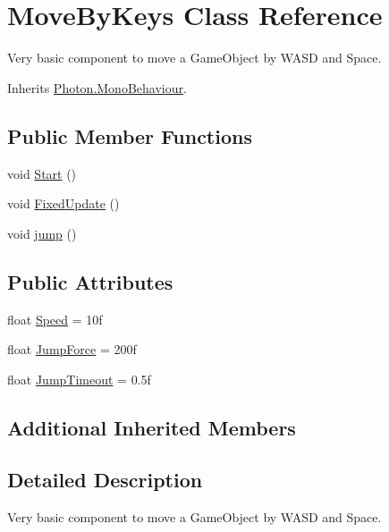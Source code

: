 \hypertarget{class_move_by_keys}{}\section{Move\+By\+Keys Class Reference}
\label{class_move_by_keys}


Very basic component to move a Game\+Object by W\+A\+SD and Space.  




Inherits \hyperlink{class_photon_1_1_mono_behaviour}{Photon.\+Mono\+Behaviour}.

\subsection*{Public Member Functions}
\begin{DoxyCompactItemize}
\item 
void \hyperlink{class_move_by_keys_a12c386cc63b886a811e2801c6631f7c6}{Start} ()
\item 
void \hyperlink{class_move_by_keys_aeeea5b489d6daab0aa8e9fc1672f5310}{Fixed\+Update} ()
\item 
void \hyperlink{class_move_by_keys_ac525502eb52c76a17385c13ba9168247}{jump} ()
\end{DoxyCompactItemize}
\subsection*{Public Attributes}
\begin{DoxyCompactItemize}
\item 
float \hyperlink{class_move_by_keys_aaa10538c39f807176b9edecb494f6ace}{Speed} = 10f
\item 
float \hyperlink{class_move_by_keys_a88d3e6e148a44325eb48ec6cc3fd0f03}{Jump\+Force} = 200f
\item 
float \hyperlink{class_move_by_keys_a78f351dfc4cfdf17213df54dee9ba73f}{Jump\+Timeout} = 0.\+5f
\end{DoxyCompactItemize}
\subsection*{Additional Inherited Members}


\subsection{Detailed Description}
Very basic component to move a Game\+Object by W\+A\+SD and Space. 

